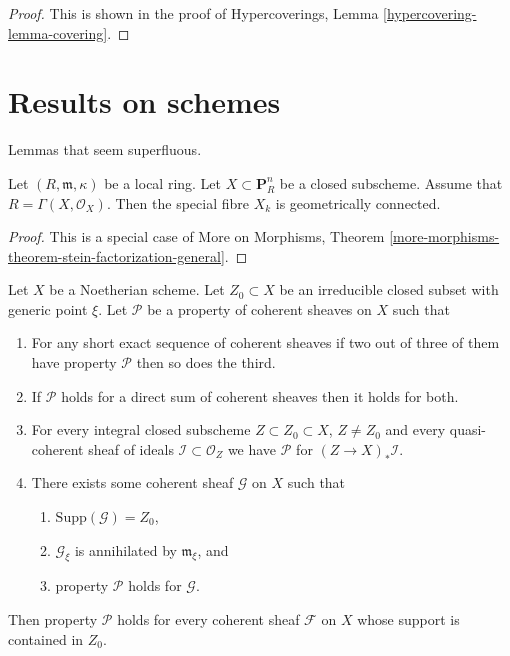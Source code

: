 \begin{proof}
This is shown in the proof of
Hypercoverings, Lemma \ref{hypercovering-lemma-covering}.
\end{proof}




\section{Results on schemes}
\label{section-devissage}

\noindent
Lemmas that seem superfluous.

\begin{lemma}
\label{lemma-stein-projective}
Let $(R, \mathfrak m, \kappa)$ be a local ring.
Let $X \subset \mathbf{P}^n_R$ be a closed subscheme.
Assume that $R = \Gamma(X, \mathcal{O}_X)$. Then the special fibre
$X_k$ is geometrically connected.
\end{lemma}

\begin{proof}
This is a special case of
More on Morphisms, Theorem
\ref{more-morphisms-theorem-stein-factorization-general}.
\end{proof}

\begin{lemma}
\label{lemma-property-irreducible-higher-rank}
Let $X$ be a Noetherian scheme.
Let $Z_0 \subset X$ be an irreducible closed subset with generic point $\xi$.
Let $\mathcal{P}$ be a property of coherent sheaves on $X$ such that
\begin{enumerate}
\item For any short exact sequence of coherent sheaves if two
out of three of them have property $\mathcal{P}$ then so does the
third.
\item If $\mathcal{P}$ holds for a direct sum of coherent sheaves
then it holds for both.
\item For every integral closed subscheme $Z \subset Z_0 \subset X$,
$Z \not = Z_0$ and every quasi-coherent sheaf of ideals
$\mathcal{I} \subset \mathcal{O}_Z$ we have
$\mathcal{P}$ for $(Z \to X)_*\mathcal{I}$.
\item There exists some coherent sheaf $\mathcal{G}$ on $X$ such that
\begin{enumerate}
\item $\text{Supp}(\mathcal{G}) = Z_0$,
\item $\mathcal{G}_\xi$ is annihilated by $\mathfrak m_\xi$, and
\item property $\mathcal{P}$ holds for $\mathcal{G}$.
\end{enumerate}
\end{enumerate}
Then property $\mathcal{P}$ holds for every coherent sheaf
$\mathcal{F}$ on $X$ whose support is contained in $Z_0$.
\end{lemma}

